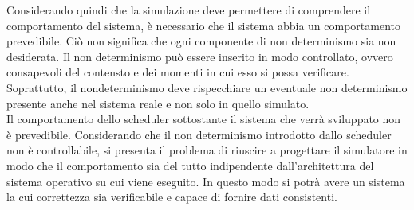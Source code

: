 Considerando quindi che la simulazione deve permettere di comprendere il comportamento del sistema, è necessario che il sistema abbia 
un comportamento prevedibile. Ciò non significa che ogni componente di non determinismo sia non desiderata. Il non determinismo
può essere inserito in modo controllato, ovvero consapevoli del contensto e dei momenti in cui esso si possa verificare. Soprattutto,
il nondeterminismo deve rispecchiare un eventuale non determinismo presente anche nel sistema reale e non solo in quello simulato.\\
Il comportamento dello scheduler sottostante il sistema che verrà sviluppato non è prevedibile. Considerando che il non determinismo
introdotto dallo scheduler non è controllabile, si presenta
il problema di riuscire a progettare il simulatore in modo
che il comportamento sia del tutto indipendente dall'architettura del sistema operativo su cui viene eseguito. In questo
modo si potrà avere un sistema la cui correttezza sia verificabile e capace di fornire dati consistenti.

